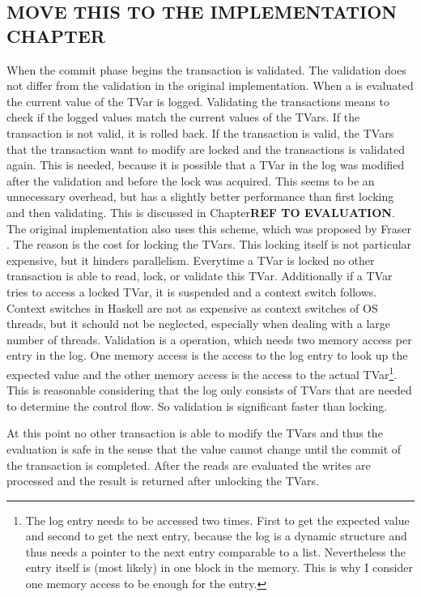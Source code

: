 \subsection{MOVE THIS TO THE IMPLEMENTATION CHAPTER}
When the commit phase begins the transaction is validated. The validation does not differ from the validation 
in the original implementation. When a  is evaluated the current value of the TVar is logged. 
Validating the transactions means to check if the logged values match the current values of the TVars. 
If the transaction is not valid, it is rolled back.
If the transaction is valid, the TVars that the transaction want to modify are locked and the transactions is validated again. 
This is needed, because it is possible that a TVar in the log was modified after the validation and before 
the lock was acquired. This seems to be an unnecessary overhead, but has a slightly better performance than first 
locking and then validating. This is discussed in Chapter\textbf{REF TO EVALUATION}. The original implementation 
also uses this scheme, which was proposed by Fraser \parencite[Page 42]{lockfreedom}. The reason is
the cost for locking the TVars. This locking itself is not particular expensive, but it hinders parallelism.
Everytime a TVar is locked no other transaction is able to read, lock, or validate this TVar. Additionally if 
a TVar tries to access a locked TVar, it is suspended and a context switch follows. Context switches in Haskell 
are not as expensive as context switches of OS threads, but it schould not be neglected, especially when dealing
with a large number of threads. Validation is a operation, which needs two memory access per entry in the log.
One memory access is the access to the log entry to look up the expected value and the other memory access is
the access to the actual TVar\footnote{The log entry needs to be accessed two times. First to get the expected
value and second to get the next entry, because the log is a dynamic structure and thus needs a pointer
to the next entry comparable to a list. Nevertheless the entry itself is (most likely) in one block in the memory.
This is why I consider one memory access to be enough for the entry.}. This is reasonable considering that the 
log only consists of TVars that are needed to determine the control flow. So validation is significant faster
than locking. 


At this point no other transaction is able to modify the TVars and thus the evaluation is safe in the sense
that the value cannot change until the commit of the transaction is completed. After the reads are evaluated the 
writes are processed and the result is returned after unlocking the TVars.



